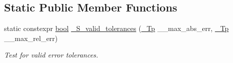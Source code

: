 \subsection*{Static Public Member Functions}
\begin{DoxyCompactItemize}
\item 
static constexpr \hyperlink{namespace____gnu__cxx_ae83aca57f97767d5d09188718728a0ac}{bool} \hyperlink{struct____gnu__cxx_1_1error__tolerance__t_af17fb63ac7623ad0090241cff57b7492}{\+\_\+\+S\+\_\+valid\+\_\+tolerances} (\hyperlink{namespace____gnu__cxx_a3b19a9c800ca194374ef9172290f7d79}{\+\_\+\+Tp} \+\_\+\+\_\+max\+\_\+abs\+\_\+err, \hyperlink{namespace____gnu__cxx_a3b19a9c800ca194374ef9172290f7d79}{\+\_\+\+Tp} \+\_\+\+\_\+max\+\_\+rel\+\_\+err)
\begin{DoxyCompactList}\small\item\em Test for valid error tolerances. \end{DoxyCompactList}\end{DoxyCompactItemize}
